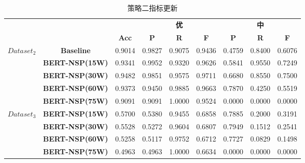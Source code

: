 \documentclass[11pt]{article}
\begin{document}
\begin{CJK}{UTF8}{gkai}
\begin{table}[htbp]\small
  \centering
  \begin{tabular}{c|c|ccccccc}
    \hline
    \multicolumn{3}{c}{}  & \multicolumn{3}{c}{\textbf{优}} & \multicolumn{3}{c}{\textbf{中}} \\
    \multicolumn{2}{c}{} & \textbf{Acc} & \textbf{P} & \textbf{R} & \textbf{F} & \textbf{P} & \textbf{R} & \textbf{F} \\
    \hline
    \multirow{5}[0]{*}{$Dataset_2$} & \textbf{Baseline} & 0.9014  & 0.9827  & 0.9075  & 0.9436  & 0.4759  & 0.8400  & 0.6076  \\
    & \textbf{BERT-NSP(15W)} & 0.9341  & 0.9952  & 0.9320  & 0.9626  & 0.5841  & 0.9550  & 0.7249  \\
    & \textbf{BERT-NSP(30W)} & 0.9482  & 0.9851  & 0.9575  & 0.9711  & 0.6680  & 0.8550  & 0.7500  \\
    & \textcolor[rgb]{ .502,  .502,  .502}{\textbf{BERT-NSP(60W)}} & \textcolor[rgb]{ .502,  .502,  .502}{0.9373 } & \textcolor[rgb]{ .502,  .502,  .502}{0.9450 } & \textcolor[rgb]{ .502,  .502,  .502}{0.9885 } & \textcolor[rgb]{ .502,  .502,  .502}{0.9663 } & \textcolor[rgb]{ .502,  .502,  .502}{0.7870 } & \textcolor[rgb]{ .502,  .502,  .502}{0.4250 } & \textcolor[rgb]{ .502,  .502,  .502}{0.5519 } \\
    & \textcolor[rgb]{ .502,  .502,  .502}{\textbf{BERT-NSP(75W)}} & \textcolor[rgb]{ .502,  .502,  .502}{0.9091 } & \textcolor[rgb]{ .502,  .502,  .502}{0.9091 } & \textcolor[rgb]{ .502,  .502,  .502}{1.0000 } & \textcolor[rgb]{ .502,  .502,  .502}{0.9524 } & \textcolor[rgb]{ .502,  .502,  .502}{0.0000 } & \textcolor[rgb]{ .502,  .502,  .502}{0.0000 } & \textcolor[rgb]{ .502,  .502,  .502}{0.0000 } \\
    \hline
    \multirow{4}[0]{*}{$Dataset_3$} & \textbf{BERT-NSP(15W)} & 0.5700  & 0.5380  & 0.9455  & 0.6858  & 0.7885  & 0.2000  & 0.3191  \\
    & \textbf{BERT-NSP(30W)} & 0.5528  & 0.5272  & 0.9604  & 0.6807  & 0.7949  & 0.1512  & 0.2541  \\
    & \textcolor[rgb]{ .502,  .502,  .502}{\textbf{BERT-NSP(60W)}} & \textcolor[rgb]{ .502,  .502,  .502}{0.5258 } & \textcolor[rgb]{ .502,  .502,  .502}{0.5117 } & \textcolor[rgb]{ .502,  .502,  .502}{0.9752 } & \textcolor[rgb]{ .502,  .502,  .502}{0.6712 } & \textcolor[rgb]{ .502,  .502,  .502}{0.7727 } & \textcolor[rgb]{ .502,  .502,  .502}{0.0829 } & \textcolor[rgb]{ .502,  .502,  .502}{0.1498 } \\
    & \textcolor[rgb]{ .502,  .502,  .502}{\textbf{BERT-NSP(75W)}} & \textcolor[rgb]{ .502,  .502,  .502}{0.4963 } & \textcolor[rgb]{ .502,  .502,  .502}{0.4963 } & \textcolor[rgb]{ .502,  .502,  .502}{1.0000 } & \textcolor[rgb]{ .502,  .502,  .502}{0.6634 } & \textcolor[rgb]{ .502,  .502,  .502}{0.0000 } & \textcolor[rgb]{ .502,  .502,  .502}{0.0000 } & \textcolor[rgb]{ .502,  .502,  .502}{0.0000 } \\
    \hline
  \end{tabular}%
  \caption{策略二指标更新}
  \label{tab:addlabel}%
\end{table}%



\end{CJK}
\end{document}
